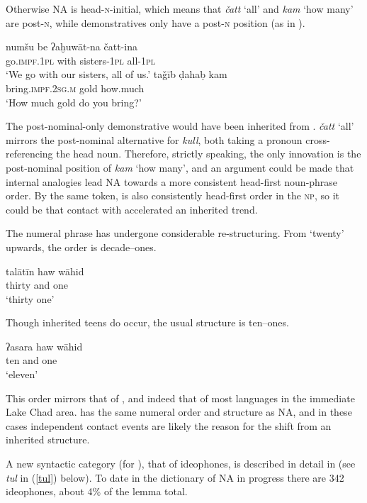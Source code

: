 \documentclass[output=paper]{langsci/langscibook}
\begin{document}
Otherwise NA is head-\textsc{n}-initial, which means that \textit{čatt} ‘all’ and \textit{kam} ‘how many’ are post-\textsc{n}, while {demonstratives} only have a post-\textsc{n} position (as in ).

\ea \gll numšu be ʔaḫuwāt-na čatt-ina\\
     go.\textsc{impf.1pl} with sisters-1\textsc{pl} all-\textsc{1pl}\\
\glt ‘We go with our sisters, all of us.’
\ex \gll taǧīb ḍahaḅ kam\\
     bring.\textsc{impf.2sg.m} gold how.much\\
\glt ‘How much gold do you bring?’
\z

The post-nominal-only demonstrative would have been inherited from . \textit{čatt} ‘all’ mirrors the post-nominal alternative for \textit{kull}, both taking a pronoun cross-referencing the head noun. Therefore, strictly speaking, the only innovation is the post-nominal position of \textit{kam} ‘how many’, and an argument could be made that internal analogies lead NA towards a more consistent head-first noun-phrase order. By the same token,  is also consistently head-first order in the \textsc{np}, so it could be that contact with  accelerated an inherited trend.

The numeral phrase has undergone considerable re-structuring. From `twenty' upwards, the order is decade--ones.

\ea \gll talātīn haw wāhid\\
     thirty and one\\
\glt ‘thirty one’
\z

Though inherited teens do occur, the usual structure is ten--ones.

\ea \gll ʔasara haw wāhid\\
     ten and one\\
\glt ‘eleven’
\z

This order mirrors that of  \citep[203]{Hutchison1981}, and indeed that of most languages in the immediate {Lake Chad} area.   has the same numeral order and structure as NA, and in these cases independent contact events are likely the reason for the shift from an inherited structure.


A new syntactic category (for ), that of {ideophones}, is described in detail in \citet{OwensHassan2004} (see \textit{tul} in (\ref{tul}) below). To date in the dictionary of NA in progress there are 342 {ideophones}, about 4\% of the lemma total.
\end{document}
